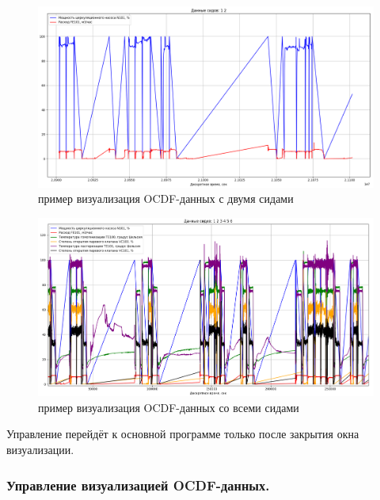 {  \begin{figure}[H]
    \centering
    \includegraphics[width=\textwidth]{images/forDataManipulator/OCDFVisualTwoCIDs.png}
    \caption{пример визуализация OCDF-данных с двумя сидами} 
    \label{fig:OCDFVisualTwoCIDs}
  \end{figure}

  \begin{figure}[H]
    \centering
    \includegraphics[width=\textwidth]{images/forDataManipulator/OCDFVisualAllCIDs.png}
    \caption{пример визуализация OCDF-данных со всеми сидами}
    \label{fig:OCDFVisualAllCIDs}
  \end{figure}

  \par Управление перейдёт к основной программе только после закрытия окна визуализации.  

  \par 
}

\subsubsection{ \standartTitleFont
  Управление визуализацией OCDF-данных.
} \label{subsubsec:OCDFVisualControl}


